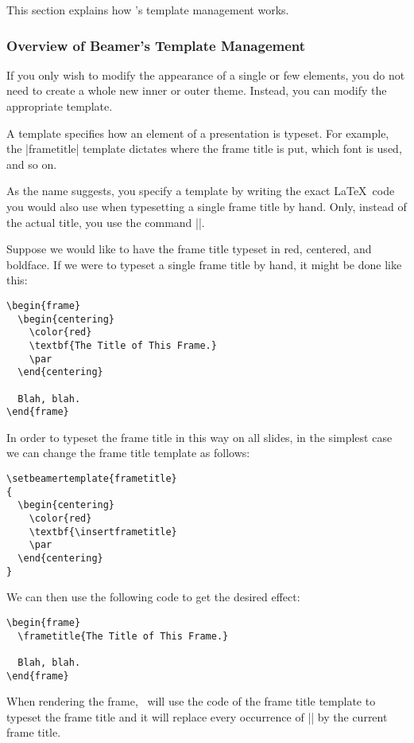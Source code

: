 This section explains how \beamer's template management works.

\subsubsection{Overview of Beamer's Template Management}

If you only wish to modify the appearance of a single or few elements, you do not need to create a whole new inner or outer theme. Instead, you can modify the appropriate template.

A template specifies how an element of a presentation is typeset. For example, the |frametitle| template dictates where the frame title is put, which font is used, and so on.

As the name suggests, you specify a template by writing the exact \LaTeX\ code you would also use when typesetting a single frame title by hand. Only, instead of the actual title, you use the command |\insertframetitle|.

\example
Suppose we would like to have the frame title typeset in red, centered, and boldface. If we were to typeset a single frame title by hand, it might be done like this:
\begin{verbatim}
\begin{frame}
  \begin{centering}
    \color{red}
    \textbf{The Title of This Frame.}
    \par
  \end{centering}

  Blah, blah.
\end{frame}
\end{verbatim}
In order to typeset the frame title in this way on all slides, in the simplest case we can change the frame title template as follows:
\begin{verbatim}
\setbeamertemplate{frametitle}
{
  \begin{centering}
    \color{red}
    \textbf{\insertframetitle}
    \par
  \end{centering}
}
\end{verbatim}
We can then use the following code to get the desired effect:
\begin{verbatim}
\begin{frame}
  \frametitle{The Title of This Frame.}

  Blah, blah.
\end{frame}
\end{verbatim}
When rendering the frame, \beamer\ will use the code of the frame title template to typeset the frame title and it will replace every occurrence of |\insertframetitle| by the current frame title.

